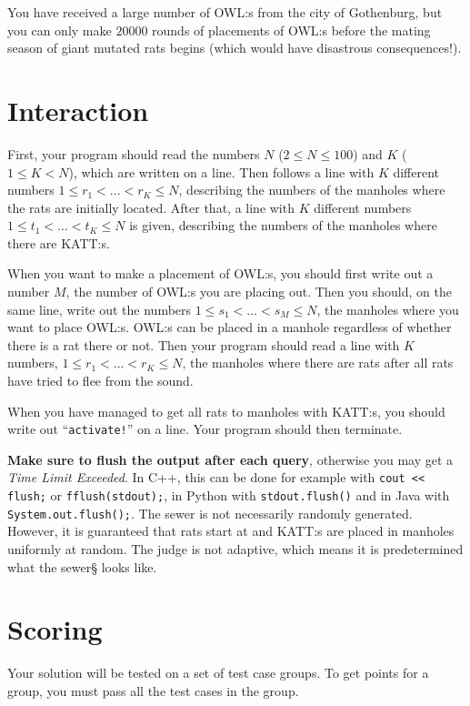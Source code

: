 You have received a large number of OWL:s from the city of Gothenburg, but you can only make $20000$ rounds of placements of OWL:s before
the mating season of giant mutated rats begins (which would have disastrous consequences!).

\section*{Interaction}
First, your program should read the numbers $N$ ($2 \leq N \leq 100$) and $K$ ($1 \leq K < N$), which are written on a line.
Then follows a line with $K$ different numbers $1 \leq r_1 < ... < r_K \leq N$, describing the numbers of the manholes where the rats are initially located.
After that, a line with $K$ different numbers $1 \leq t_1 < ... < t_K \leq N$ is given, describing the numbers of the manholes where there are KATT:s.

When you want to make a placement of OWL:s, you should first write out a number $M$, the number of OWL:s you are placing out.
Then you should, on the same line, write out the numbers $1 \leq s_1 < ... < s_M \leq N$,
the manholes where you want to place OWL:s. OWL:s can be placed in a manhole regardless of whether there is a rat there or not.
Then your program should read a line with $K$ numbers, $1 \leq r_1 < ... < r_K \leq N$,
the manholes where there are rats after all rats have tried to flee from the sound.

When you have managed to get all rats to manholes with KATT:s, you should write out ``\texttt{activate!}'' on a line.
Your program should then terminate.

\textbf{Make sure to flush the output after each query}, otherwise you may get a \textit{Time Limit Exceeded}.
In C++, this can be done for example with \texttt{cout << flush;}
or \texttt{fflush(stdout);},
in Python with \texttt{stdout.flush()}
and in Java with \texttt{System.out.flush();}.
The sewer is not necessarily randomly generated.
However, it is guaranteed that rats start at and KATT:s are placed in manholes uniformly at random.
The judge is not adaptive, which means it is predetermined what the sewer§ looks like.

\section*{Scoring}
Your solution will be tested on a set of test case groups.
To get points for a group, you must pass all the test cases in the group.

